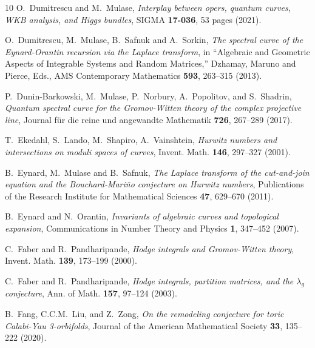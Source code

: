 \documentclass{amsart}
\theoremstyle{definition}
\numberwithin{equation}{section}
\numberwithin{figure}{section}
\begin{document}
\begin{thebibliography}{10}
O.~Dumitrescu and M.~Mulase,
\emph{Interplay between opers, quantum curves, WKB analysis, and Higgs bundles}, SIGMA \textbf{17-036}, 53 pages (2021).

 

 O.~Dumitrescu,  M.~Mulase, B.~Safnuk and A.~Sorkin, 
\emph{The spectral curve of the Eynard-Orantin recursion via the Laplace transform},  in ``Algebraic and Geometric Aspects of Integrable Systems and Random Matrices,'' Dzhamay, Maruno and Pierce, Eds., AMS Contemporary Mathematics \textbf{593}, 263--315 (2013).


P.~Dunin-Barkowski, M.~Mulase,
P.~Norbury, A.~Popolitov, and  S.~Shadrin,
\emph{Quantum spectral curve for the Gromov-Witten 
theory of the complex projective line},
Journal f\"ur die reine und angewandte Mathematik \textbf{726}, 267--289 (2017).

 
 


 T.~Ekedahl, S.~Lando, M.~Shapiro, A.~Vainshtein,
\emph{Hurwitz numbers and intersections on moduli spaces of curves},
Invent. Math. {\bf 146}, 297--327 (2001).









   B.~Eynard, M.~Mulase
  and B.~Safnuk,
  \emph{The
{L}aplace transform  of the cut-and-join equation
and the {B}ouchard-{M}ari\~no conjecture on
{H}urwitz numbers}, Publications of the Research Institute for Mathematical Sciences \textbf{47}, 629--670 (2011).




  B.~Eynard and N.~Orantin,
\emph{Invariants of algebraic curves and topological expansion},
Communications in Number Theory
and Physics {\bf 1},  347--452 (2007).





C.~Faber and R.~Pandharipande,
\emph{Hodge integrals and Gromov-Witten theory},
Invent. Math. \textbf{139}, 173--199 (2000).


C.~Faber and R.~Pandharipande,
\emph{Hodge integrals, partition matrices, and the
$\lambda_g$ conjecture},
Ann. of  Math. \textbf{157}, 97--124 (2003).

B.~Fang, C.C.M.~Liu, and Z.~Zong,
\emph{On the remodeling conjecture for toric Calabi-Yau 3-orbifolds},
Journal of the American Mathematical Society \textbf{33}, 135--222 (2020).




\end{thebibliography}
\end{document}
